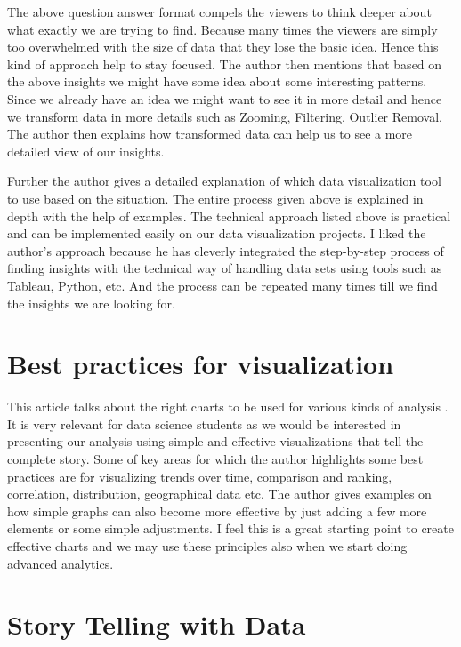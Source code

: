 \documentclass[]{book}
\theoremstyle{definition}
\theoremstyle{definition}
\theoremstyle{definition}
\theoremstyle{remark}
\begin{document}
The above question answer format compels the viewers to think deeper
about what exactly we are trying to find. Because many times the viewers
are simply too overwhelmed with the size of data that they lose the
basic idea. Hence this kind of approach help to stay focused. The author
then mentions that based on the above insights we might have some idea
about some interesting patterns. Since we already have an idea we might
want to see it in more detail and hence we transform data in more
details such as Zooming, Filtering, Outlier Removal. The author then
explains how transformed data can help us to see a more detailed view of
our insights.

Further the author gives a detailed explanation of which data
visualization tool to use based on the situation. The entire process
given above is explained in depth with the help of examples. The
technical approach listed above is practical and can be implemented
easily on our data visualization projects. I liked the author's approach
because he has cleverly integrated the step-by-step process of finding
insights with the technical way of handling data sets using tools such
as Tableau, Python, etc. And the process can be repeated many times till
we find the insights we are looking for.

\section{Best practices for
visualization}\label{best-practices-for-visualization}

This article talks about the right charts to be used for various kinds
of analysis \citep{DataVizBestPrac}. It is very relevant for data
science students as we would be interested in presenting our analysis
using simple and effective visualizations that tell the complete story.
Some of key areas for which the author highlights some best practices
are for visualizing trends over time, comparison and ranking,
correlation, distribution, geographical data etc. The author gives
examples on how simple graphs can also become more effective by just
adding a few more elements or some simple adjustments. I feel this is a
great starting point to create effective charts and we may use these
principles also when we start doing advanced analytics.

\section{Story Telling with Data}\label{story-telling-with-data}
\end{document}
